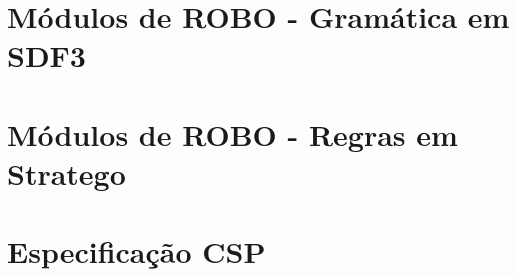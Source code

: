 \appendix

\chapter{Módulos de ROBO - Gramática em SDF3}

\chapter{Módulos de ROBO - Regras em Stratego}

\chapter{Especificação CSP}
%